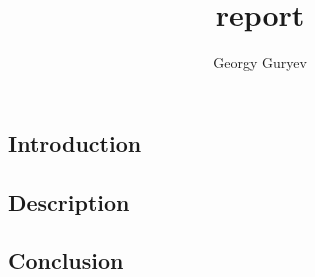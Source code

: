 \documentclass{article}
\title{report}
\author{Georgy Guryev}
\begin{document}
\maketitle

\subsection*{Introduction}

\subsection*{Description} 

\subsection*{Conclusion}
\end{document}
